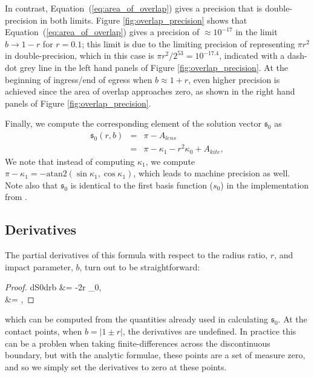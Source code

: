 \documentclass[modern]{aastex61}
\begin{document}
In contrast, Equation~(\ref{eq:area_of_overlap}) gives a precision
that is double-precision in both limits.  Figure
\ref{fig:overlap_precision} shows that Equation~(\ref{eq:area_of_overlap})
gives a precision of $\approx 10^{-17}$ in the limit $b \rightarrow
1-r$ for $r=0.1$; this limit is due to the limiting precision of
representing $\pi r^2$ in double-precision, which in this case
is $\pi r^2 / 2^{53} = 10^{-17.4}$, indicated with a dash-dot
grey line in the left hand panels of Figure \ref{fig:overlap_precision}.
At the beginning of ingress/end of egress when $b \approx 1+r$,
even higher precision is achieved since the area of overlap approaches
zero, as shown in the right hand panels of Figure \ref{fig:overlap_precision}.

Finally, we compute the corresponding element of the solution vector $\mathfrak{s}_0$
as
%
\begin{eqnarray} \label{eq:uniform}
    \label{eq:s0}
    \mathfrak{s}_0(r,b) &=& \pi-A_{lens}\nonumber\\
                        &=&\pi -\kappa_1 - r^2\kappa_0 + A_{kite},
\end{eqnarray}
%
We note that instead of computing $\kappa_1$,
we compute $\pi-\kappa_1 = -\mathrm{atan2}(\sin{\kappa_1},\cos{\kappa_1})$,
which leads to machine precision as well. Note also that $\mathfrak{s}_0$ is
identical to the first basis function ($s_0$) in the \starry implementation
from \citet{starry}.

\subsection{Derivatives}

The partial derivatives of this formula with respect to the radius
ratio, $r$, and impact parameter, $b$, turn out to be straightforward:
\begin{proof}{dS0drb}\label{eq:dS0_drb}
 &= -2r \kappa_0,\nonumber\\
 &= ,
\end{proof}
which can be computed from the quantities already used in calculating $\mathfrak{s}_0$.
At the contact points, when $b = \vert 1\pm r\vert$, the derivatives are undefined.
In practice this can be a problen when taking finite-differences across
the discontinuous boundary, but with the analytic formulae, these points
are a set of measure zero, and so we simply set the derivatives to zero
at these points.
\end{document}
